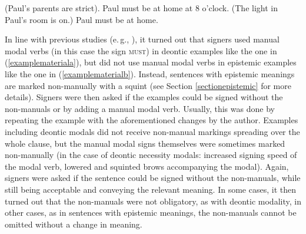 \begin{exe}
\ex\label{examplematerial}\begin{xlist}
\ex (Paul's parents are strict). Paul must be at home at 8 o'clock. \label{examplemateriala}
\ex (The light in Paul's room is on.) Paul must be at home. \label{examplematerialb}
\end{xlist}
\end{exe}

\noindent In line with previous studies (e.\,g., \citealt{herrmann2013modal}), it turned out that signers used manual modal verbs (in this case the sign \textsc{must}) in deontic examples like the one in (\ref{examplemateriala}), but did not use manual modal verbs in epistemic examples like the one in (\ref{examplematerialb}). Instead, sentences with epistemic meanings are marked non-manually with a squint (see Section \ref{sectionepistemic} for more details). Signers were then asked if the examples could be signed without the non-manuals or by adding a manual modal verb. Usually, this was done by repeating the example with the aforementioned changes by the author. Examples including deontic modals did not receive non-manual markings spreading over the whole clause, but the manual modal signs themselves were sometimes marked non-manually (in the case of deontic necessity modals: increased signing speed of the modal verb, lowered and squinted brows accompanying the modal). Again, signers were asked if the sentence could be signed without the non-manuals, while still being acceptable and conveying the relevant meaning. In some cases, it then turned out that the non-manuals were not obligatory, as with deontic modality, in other cases, as in sentences with epistemic meanings, the non-manuals cannot be omitted without a change in meaning. 

